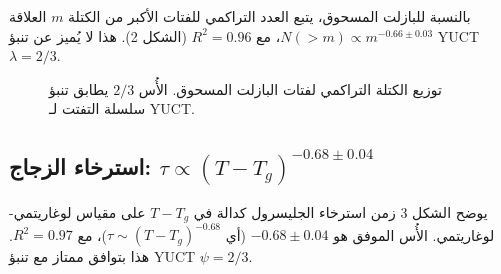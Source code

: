 \documentclass[11pt,a4paper]{article}
\begin{document}
	بالنسبة للبازلت المسحوق، يتبع العدد التراكمي للفتات الأكبر من الكتلة \(m\) العلاقة \(N(>m) \propto m^{-0.66 \pm 0.03}\)، مع \(R^2 = 0.96\) (الشكل 2). هذا لا يُميز عن تنبؤ YUCT \(\lambda = 2/3\).
	
	\begin{otherlanguage}{english}
		\begin{figure}[htbp]
			\centering
			\caption{توزيع الكتلة التراكمي لفتات البازلت المسحوق. الأُس \(2/3\) يطابق تنبؤ سلسلة التفتت لـ YUCT.}
			\label{fig:fragmentation}
		\end{figure}
	\end{otherlanguage}
	
	\subsection{استرخاء الزجاج: \(\tau \propto (T - T_g)^{-0.68 \pm 0.04}\)}
	
	يوضح الشكل 3 زمن استرخاء الجليسرول كدالة في \(T - T_g\) على مقياس لوغاريتمي-لوغاريتمي. الأُس الموفق هو \(-0.68 \pm 0.04\) (أي \(\tau \sim (T - T_g)^{-0.68}\))، مع \(R^2 = 0.97\). هذا بتوافق ممتاز مع تنبؤ YUCT \(\psi = 2/3\).
	
\end{document}
